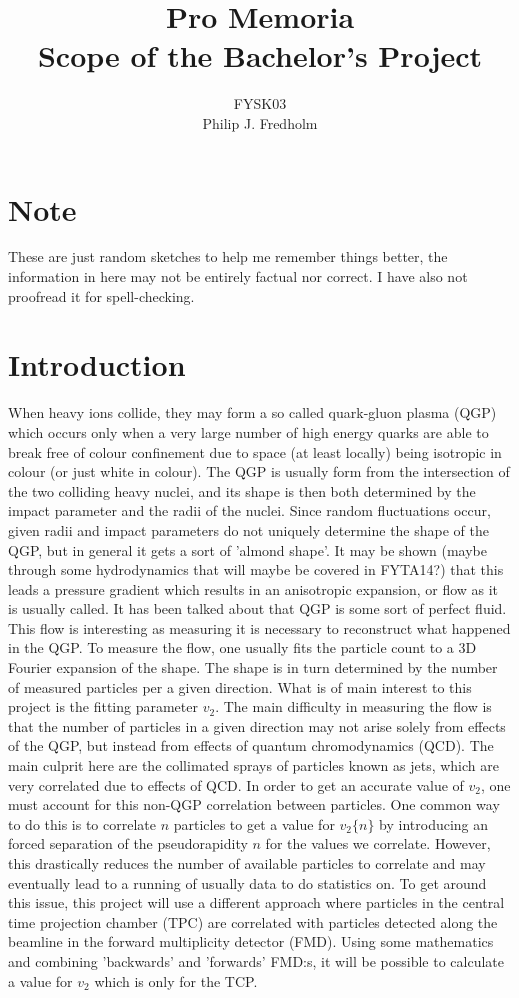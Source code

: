 \documentclass[a4, 12pt]{article}
\title{
Pro Memoria \\
Scope of the Bachelor's Project
}
\author{FYSK03 \\ Philip J. Fredholm}
\date{}
\begin{document}
\maketitle


\section{Note}
These are just random sketches to help me remember things better, the information in here may not be entirely factual nor correct. I have also not proofread it for spell-checking. 
\section{Introduction}
When heavy ions collide, they may form a so called quark-gluon plasma (QGP) which occurs only when a very large number of high energy quarks are able to break free of colour confinement due to space (at least locally) being isotropic in colour (or just white in colour). The QGP is usually form from the intersection of the two colliding heavy nuclei, and its shape is then both determined by the impact parameter and the radii of the nuclei. Since random fluctuations occur, given radii and impact parameters do not uniquely determine the shape of the QGP, but in general it gets a sort of 'almond shape'. It may be shown (maybe through some hydrodynamics that will maybe be covered in FYTA14?) that this leads a pressure gradient which results in an anisotropic expansion, or flow as it is usually called. It has been talked about that QGP is some sort of perfect fluid. This flow is interesting as measuring it is necessary to reconstruct what happened in the QGP. \newline 
\indent To measure the flow, one usually fits the particle count to a 3D Fourier expansion of the shape. The shape is in turn determined by the number of measured particles per a given direction. What is of main interest to this project is the fitting parameter $v_2$. The main difficulty in measuring the flow is that the number of particles in a given direction may not arise solely from effects of the QGP, but instead from effects of quantum chromodynamics (QCD). The main culprit here are the collimated sprays of particles known as jets, which are very correlated due to effects of QCD. In order to get an accurate value of $v_2$, one must account for this non-QGP correlation between particles. \newline	
\indent One common way to do this is to correlate $n$ particles to get a value for $v_2\{n\}$ by introducing an forced separation of the pseudorapidity $n$ for the values we correlate. However, this drastically reduces the number of available particles to correlate and may eventually lead to a running of usually data to do statistics on. To get around this issue, this project will use a different approach where particles in the central time projection chamber (TPC) are correlated with particles detected along the beamline in the forward multiplicity detector (FMD). Using some mathematics and combining 'backwards' and 'forwards' FMD:s, it will be possible to calculate a value for $v_2$ which is only for the TCP. \newline
\end{document}
